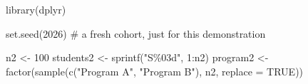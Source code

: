 \documentclass[
  letterpaper,
  DIV=11,
  numbers=noendperiod]{scrreprt}
\newenvironment{Shaded}{\begin{snugshade}}{\end{snugshade}}
\newcommand{\AttributeTok}[1]{\textcolor[rgb]{0.40,0.45,0.13}{#1}}
\newcommand{\CommentTok}[1]{\textcolor[rgb]{0.37,0.37,0.37}{#1}}
\newcommand{\ConstantTok}[1]{\textcolor[rgb]{0.56,0.35,0.01}{#1}}
\newcommand{\DecValTok}[1]{\textcolor[rgb]{0.68,0.00,0.00}{#1}}
\newcommand{\FunctionTok}[1]{\textcolor[rgb]{0.28,0.35,0.67}{#1}}
\newcommand{\NormalTok}[1]{\textcolor[rgb]{0.00,0.23,0.31}{#1}}
\newcommand{\OtherTok}[1]{\textcolor[rgb]{0.00,0.23,0.31}{#1}}
\newcommand{\SpecialCharTok}[1]{\textcolor[rgb]{0.37,0.37,0.37}{#1}}
\newcommand{\StringTok}[1]{\textcolor[rgb]{0.13,0.47,0.30}{#1}}
\begin{document}
\begin{Shaded}
\begin{Highlighting}[]
\FunctionTok{library}\NormalTok{(dplyr)}

\FunctionTok{set.seed}\NormalTok{(}\DecValTok{2026}\NormalTok{)   }\CommentTok{\# a fresh cohort, just for this demonstration}

\NormalTok{n2 }\OtherTok{\textless{}{-}} \DecValTok{100}
\NormalTok{students2 }\OtherTok{\textless{}{-}} \FunctionTok{sprintf}\NormalTok{(}\StringTok{"S\%03d"}\NormalTok{, }\DecValTok{1}\SpecialCharTok{:}\NormalTok{n2)}
\NormalTok{program2  }\OtherTok{\textless{}{-}} \FunctionTok{factor}\NormalTok{(}\FunctionTok{sample}\NormalTok{(}\FunctionTok{c}\NormalTok{(}\StringTok{"Program A"}\NormalTok{, }\StringTok{"Program B"}\NormalTok{), n2, }\AttributeTok{replace =} \ConstantTok{TRUE}\NormalTok{))}


\end{Highlighting}
\end{Shaded}
\end{document}
